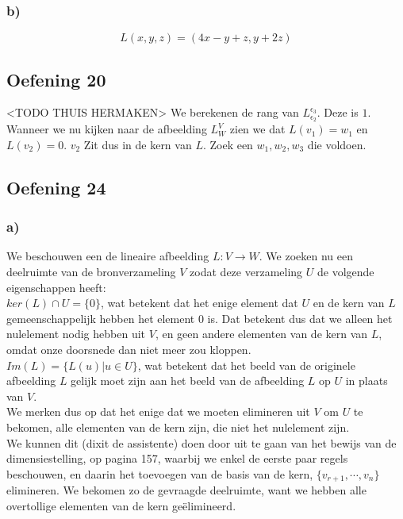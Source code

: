 \documentclass[lineaire_algebra_oplossingen.tex]{subfiles}
\begin{document}
\subsubsection*{b)}
\[
L(x,y,z) = (4x-y+z,y+2z)
\]

\subsection{Oefening 20}
<TODO THUIS HERMAKEN>
We berekenen de rang van $L_{\epsilon_2}^{\epsilon_3}$. Deze is $1$.
Wanneer we nu kijken naar de afbeelding $L_{W}^V$ zien we dat $L(v_1) = w_1$ en $L(v_2) = 0$. $v_2$ Zit dus in de kern van $L$.
Zoek een $w_1,w_2,w_3$ die voldoen.

\subsection{Oefening 24}
\subsubsection*{a)}
We beschouwen een de lineaire afbeelding $L:V\rightarrow W$. We zoeken nu een deelruimte van de bronverzameling $V$ zodat deze verzameling $U$ de volgende eigenschappen heeft:\\
$ker(L)\cap U = \{0\}$, wat betekent dat het enige element dat $U$ en de kern van $L$ gemeenschappelijk hebben het element $0$ is. Dat betekent dus dat we alleen het nulelement nodig hebben uit $V$, en geen andere elementen van de kern van $L$, omdat onze doorsnede dan niet meer zou kloppen.\\
$Im(L) = \{L(u)| u\in U\}$, wat betekent dat het beeld van de originele afbeelding $L$ gelijk moet zijn aan het beeld van de afbeelding $L$ op $U$ in plaats van $V$.\\
We merken dus op dat het enige dat we moeten elimineren uit $V$ om $U$ te bekomen, alle elementen van de kern zijn, die niet het nulelement zijn.\\
We kunnen dit (dixit de assistente) doen door uit te gaan van het bewijs van de dimensiestelling, op pagina 157, waarbij we enkel de eerste paar regels beschouwen, en daarin het toevoegen van de basis van de kern, $\{v_{r+1},\cdots,v_n\}$ elimineren. We bekomen zo de gevraagde deelruimte, want we hebben alle overtollige elementen van de kern ge\"elimineerd.
\end{document}
